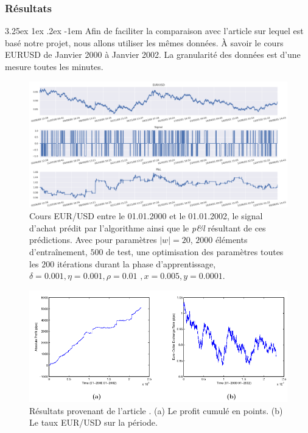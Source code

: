 \documentclass[a4paper, 11pt]{article}
\makeatletter
\renewcommand\paragraph{\@startsection{paragraph}{5}{\z@}%
  {3.25ex \@plus1ex \@minus.2ex}%
  {-1em}%
  {\normalfont\normalsize\bfseries}}
\makeatother
\begin{document}
\subsubsection{Résultats}
 \paragraph{}
 Afin de faciliter la comparaison avec l'article sur lequel est basé notre projet, nous allons utiliser les mêmes données. À savoir le cours EURUSD de Janvier 2000 à Janvier 2002. La granularité des données est d'une mesure toutes les minutes.
 
 \begin{figure}
 	\centering
 	\includegraphics[scale=0.5]{res/eursud_2000-2001}
 	\caption[Blup]{Cours EUR/USD entre le 01.01.2000 et le 01.01.2002, le signal d'achat prédit par l'algorithme ainsi que le \textit{p\&l} résultant de ces prédictions. Avec pour paramètres $|w| = 20$, $2000$ éléments d'entraînement, $500$ de test, une optimisation des
 		paramètres toutes les $200$ itérations durant la phase d'apprentissage, $\delta = 0.001, \eta=0.001,\rho=0.01$
 		\footnotemark$, x = 0.005, y=0.0001$.}
 	\label{eurusd 2000 2001 1M}
 \end{figure}

 
 \begin{figure}
	\centering
	\includegraphics[scale=0.5]{images/res_from_article}
	\caption[Blup]{Résultats provenant de l'article \cite{fx_trading}. (a) Le profit cumulé en points. (b) Le taux EUR/USD sur la période. }
	\label{eurusd 2000 2001 1M article}
\end{figure}
\end{document}
